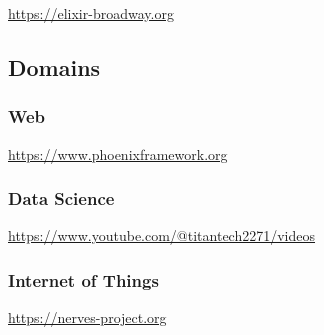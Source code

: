 {\url{https://elixir-broadway.org}

\subsection{Domains}

\subsubsection{Web}

\url{https://www.phoenixframework.org}



\subsubsection{Data Science}

\url{https://www.youtube.com/@titantech2271/videos}

\subsubsection{Internet of Things}

\url{https://nerves-project.org}

}

